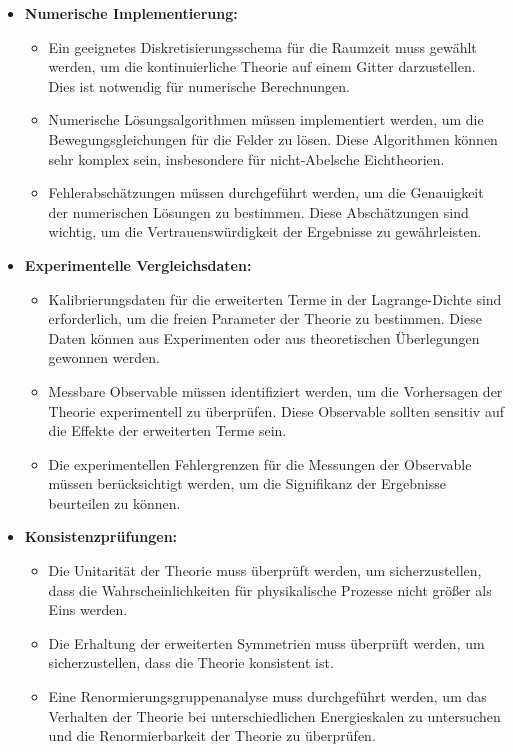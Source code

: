 \documentclass{article}
\begin{document}
\begin{itemize}
	\item \textbf{Numerische Implementierung:}
	\begin{itemize}
		\item Ein geeignetes Diskretisierungsschema für die Raumzeit muss gewählt werden, um die kontinuierliche Theorie auf einem Gitter darzustellen. Dies ist notwendig für numerische Berechnungen.
		\item Numerische Lösungsalgorithmen müssen implementiert werden, um die Bewegungsgleichungen für die Felder zu lösen. Diese Algorithmen können sehr komplex sein, insbesondere für nicht-Abelsche Eichtheorien.
		\item Fehlerabschätzungen müssen durchgeführt werden, um die Genauigkeit der numerischen Lösungen zu bestimmen. Diese Abschätzungen sind wichtig, um die Vertrauenswürdigkeit der Ergebnisse zu gewährleisten.
	\end{itemize}
	
	\item \textbf{Experimentelle Vergleichsdaten:}
	\begin{itemize}
		\item Kalibrierungsdaten für die erweiterten Terme in der Lagrange-Dichte sind erforderlich, um die freien Parameter der Theorie zu bestimmen. Diese Daten können aus Experimenten oder aus theoretischen Überlegungen gewonnen werden.
		\item Messbare Observable müssen identifiziert werden, um die Vorhersagen der Theorie experimentell zu überprüfen. Diese Observable sollten sensitiv auf die Effekte der erweiterten Terme sein.
		\item Die experimentellen Fehlergrenzen für die Messungen der Observable müssen berücksichtigt werden, um die Signifikanz der Ergebnisse beurteilen zu können.
	\end{itemize}
	
	\item \textbf{Konsistenzprüfungen:}
	\begin{itemize}
		\item Die Unitarität der Theorie muss überprüft werden, um sicherzustellen, dass die Wahrscheinlichkeiten für physikalische Prozesse nicht größer als Eins werden.
		\item Die Erhaltung der erweiterten Symmetrien muss überprüft werden, um sicherzustellen, dass die Theorie konsistent ist.
		\item Eine Renormierungsgruppenanalyse muss durchgeführt werden, um das Verhalten der Theorie bei unterschiedlichen Energieskalen zu untersuchen und die Renormierbarkeit der Theorie zu überprüfen.
	\end{itemize}
\end{itemize}
\end{document}
